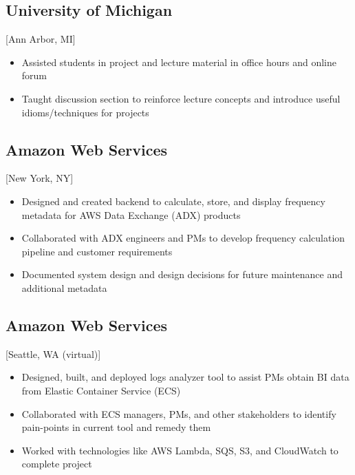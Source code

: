 \documentclass{mycv}
\begin{document}
\subsection{University of Michigan}[Ann Arbor, MI]
\begin{positions}
\end{positions}
\begin{itemize}
  \item Assisted students in project and lecture material in office hours and online forum
  \item Taught discussion section to reinforce lecture concepts and introduce useful idioms/techniques for projects
\end{itemize}

\subsection{Amazon Web Services}[New York, NY]
\begin{positions}
\end{positions}
\begin{itemize}
  \item Designed and created backend to calculate, store, and display frequency metadata for AWS Data Exchange (ADX) products
  \item Collaborated with ADX engineers and PMs to develop frequency calculation pipeline and customer requirements
  \item Documented system design and design decisions for future maintenance and additional metadata
\end{itemize}

\subsection{Amazon Web Services}[Seattle, WA (virtual)]
\begin{positions}
\end{positions}
\begin{itemize}
  \item Designed, built, and deployed logs analyzer tool to assist PMs obtain BI data from Elastic Container Service (ECS)
  \item Collaborated with ECS managers, PMs, and other stakeholders to identify pain-points in current tool and remedy them
  \item Worked with technologies like AWS Lambda, SQS, S3, and CloudWatch to complete project
\end{itemize}
\end{document}
